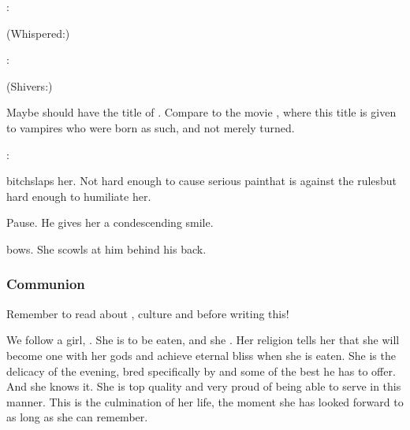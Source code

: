 \Teshrial: 


(Whispered:) 


\Teshrial: 

(Shivers:) 


Maybe \Ishnaruchaefir{} should have the title of . Compare to the movie \cite{Movie:Blade}, where this title is given to vampires who were born as such, and not merely turned. 

\Achsah: 

\Teshrial{} bitchslaps her. Not hard enough to cause serious pain\dash that is against the rules\dash but hard enough to humiliate her. 

Pause. He gives her a condescending smile. 

\Achsah{} bows. 
She scowls at him behind his back.





\subsubsection{Communion}
Remember to read about ,  culture and  before writing this!

We follow a  girl, . 
She is to be eaten, and she . 
Her religion tells her that she will become one with her gods and achieve eternal bliss when she is eaten. 
She is the delicacy of the evening, bred specifically by \Teshrial{} and some of the best he has to offer. 
And she knows it. 
She is top quality and very proud of being able to serve in this manner. 
This is the culmination of her life, the moment she has looked forward to as long as she can remember. 

